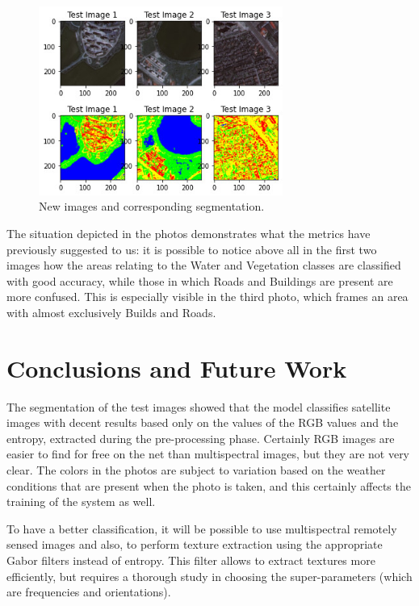 \documentclass[10pt,twocolumn,letterpaper]{article}
\begin{document}
\begin{figure}[h]
\includegraphics[width=8cm]{images/image.jpg}
\caption{New images and corresponding segmentation.}
\end{figure}

The situation depicted in the photos demonstrates what the metrics have previously suggested to us: it is possible to notice above all in the first two images how the areas relating to the Water and Vegetation classes are classified with good accuracy, while those in which Roads and Buildings are present are more confused. This is especially visible in the third photo, which frames an area with almost exclusively Builds and Roads.

\section{Conclusions and Future Work}

The segmentation of the test images showed that the model classifies satellite images with decent results based only on the values of the RGB values and the entropy, extracted during the pre-processing phase. Certainly RGB images are easier to find for free on the net than multispectral images, but they are not very clear. The colors in the photos are subject to variation based on the weather conditions that are present when the photo is taken, and this certainly affects the training of the system as well.

To have a better classification, it will be possible to use multispectral remotely sensed images and also, to perform texture extraction using the appropriate Gabor filters instead of entropy.
This filter allows to extract textures more efficiently, but requires a thorough study in choosing the super-parameters (which are frequencies and orientations).


{\small


}
\end{document}
